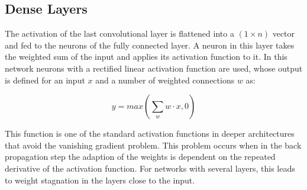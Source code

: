 \documentclass[main.tex]{subfiles}
\begin{document}
\subsection{Dense Layers}
The activation of the last convolutional layer is flattened into a $(1 \times n)$ vector and fed to the neurons of the fully connected layer. A neuron in this layer takes the weighted sum of the input and applies its activation function to it. In this network neurons with a rectified linear activation function are used, whose output is defined for an input $x$ and a number of weighted connections $w$ as:

\begin{equation}
\label{eq:dense}
y=max\left(\sum_w w \cdot x,0\right)
\end{equation}

This function is one of the standard activation functions in deeper architectures that avoid the vanishing gradient problem. This problem occurs when in the back propagation step the adaption of the weights is dependent on the repeated derivative of the activation function. For networks with several layers, this leads to weight stagnation in the layers close to the input.
\end{document}
